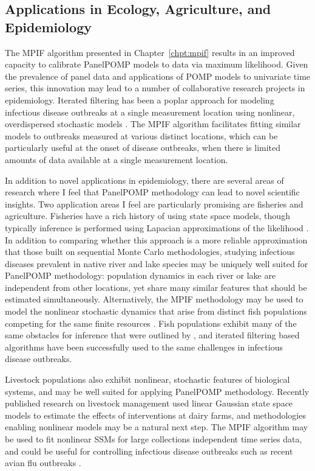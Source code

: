 \subsection*{Applications in Ecology, Agriculture, and Epidemiology}

The MPIF algorithm presented in Chapter~\ref{chpt:mpif} results in an improved capacity to calibrate PanelPOMP models to data via maximum likelihood.
Given the prevalence of panel data and applications of POMP models to univariate time series, this innovation may lead to a number of collaborative research projects in epidemiology.
Iterated filtering has been a poplar approach for modeling infectious disease outbreaks at a single measurement location using nonlinear, overdispersed stochastic models \citep[e.g.,][]{stocks20}. 
The MPIF algorithm facilitates fitting similar models to outbreaks measured at various distinct locations, which can be particularly useful at the onset of disease outbreaks, when there is limited amounts of data available at a single measurement location.

In addition to novel applications in epidemiology, there are several areas of research where I feel that PanelPOMP methodology can lead to novel scientific insights.
Two application areas I feel are particularly promising are fisheries and agriculture.
Fisheries have a rich history of using state space models, though typically inference is performed using Lapacian approximations of the likelihood \citep[e.g.,][]{auger17}.
In addition to comparing whether this approach is a more reliable approximation that those built on sequential Monte Carlo methodologies, studying infectious diseases prevalent in native river and lake species may be uniquely well suited for PanelPOMP methodology: population dynamics in each river or lake are independent from other locations, yet share many similar features that should be estimated simultaneously.
Alternatively, the MPIF methodology may be used to model the nonlinear stochastic dynamics that arise from distinct fish populations competing for the same finite resources \citep{rosenthal22}.
Fish populations exhibit many of the same obstacles for inference that were outlined by \citet{bjornstad01}, and iterated filtering based algorithms have been successfully used to the same challenges in infectious disease outbreaks.

Livestock populations also exhibit nonlinear, stochastic features of biological systems, and may be well suited for applying PanelPOMP methodology.
Recently published research on livestock management \citep{skolstrup22} used linear Gaussian state space models to estimate the effects of interventions at dairy farms, and methodologies enabling nonlinear models may be a natural next step.
The MPIF algorithm may be used to fit nonlinear SSMs for large collections independent time series data, and could be useful for controlling infectious disease outbreaks such as recent avian flu outbreaks \citep{pinotti24}.

